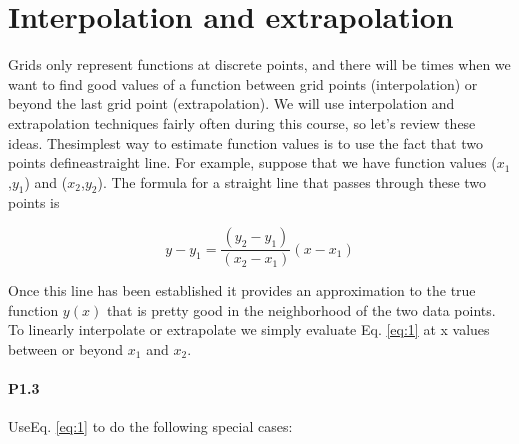     
 		\section*{Interpolation and extrapolation}
     
    Grids only represent functions at discrete points, and there will be times when we want to find good values of a function between grid points (interpolation) or beyond the last grid point (extrapolation). We will use interpolation and extrapolation techniques fairly often during this course, so let\rq s review these ideas. Thesimplest way to estimate function values is to use the fact that two points defineastraight line. For example, suppose that we have function values ($x_1$,$y_1$) and ($x_2$,$y_2$). The formula for a straight line that passes through these two points is   
    
\begin{equation} \label{eq:1}
    y - y_1 = \frac{(y_2-y_1)}{(x_2-x_1)}(x-x_1) 
\end{equation}  
  
    Once this line has been established it provides an approximation to the true function $y(x)$ that is pretty good in the neighborhood of the two data points. To linearly interpolate or extrapolate we simply evaluate Eq. \eqref{eq:1} at x values between or beyond $x_1$ and $x_2$.   
      
     \paragraph*{P1.3} UseEq. \eqref{eq:1} to do the following special cases:
     
